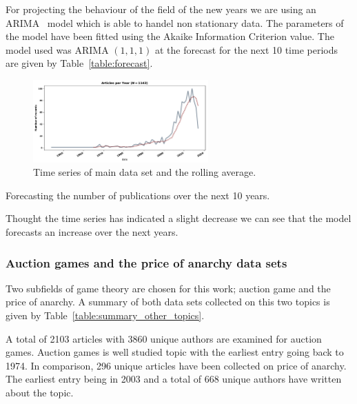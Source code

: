 \documentclass{article}
\theoremstyle{definition}
\begin{document}
For projecting the behaviour of the field of the new years we are using an ARIMA~\cite{brockwell2013}
model which is able to handel non stationary data. The parameters
of the model have been fitted using the Akaike Information Criterion value.
The model used was ARIMA \((1, 1, 1)\) at the forecast for the next 10 time
periods are given by Table~\ref{table:forecast}.

\begin{figure}[!hbtp]
    \centering
    \includegraphics[width=0.6\textwidth]{./assets/images/timeseries.pdf}
    \caption{Time series of main data set and the rolling average.}\label{fig:timeseries}
\end{figure}

\begin{table}[!hbtp]
    \begin{center}
    
    \end{center}
    \caption{Forecasting the number of publications over the next 10 years.}
    \label{table:forecast}
\end{table}

Thought the time series has indicated a slight decrease we can see that the
model forecasts an increase over the next years.

\subsubsection{Auction games and the price of anarchy data sets}

Two subfields of game theory are chosen for this work; auction game and the
price of anarchy. A summary of both data sets collected on this two topics %
is given by Table~\ref{table:summary_other_topics}.

A total of 2103 articles with 3860 unique authors are examined for auction games.
Auction games is well studied topic with the earliest entry going
back to 1974. In comparison, 296 unique articles have been collected on price of
anarchy. The earliest entry being in 2003 and a total of 668 unique authors have
written about the topic.
\end{document}

